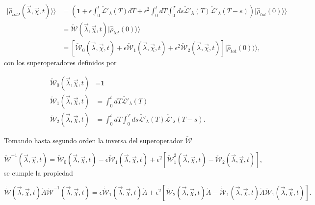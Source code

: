 \begin{appendixs}
\begin{align*}
    |\hat{\rho}_{totI}(\vec{\lambda},\vec{\chi},t)\rangle \rangle  & = \left( \textbf{1} + \epsilon \int_{0}^{t}\check{\mathcal{L}}'_{\lambda}(T)dT + \epsilon^{2}\int_{0}^{t}dT\int_{0}^{T}ds \check{\mathcal{L}}'_{\lambda}(T)\check{\mathcal{L}}'_{\lambda}(T-s) \right)|\hat{\rho}_{tot}(0)\rangle \rangle  \\
    & = \check{\mathcal{W}}(\vec{\lambda},\vec{\chi},t)|\hat{\rho}_{tot}(0)\rangle \rangle \\
    & =  [\check{\mathcal{W}}_{0}(\vec{\lambda},\vec{\chi},t) + \epsilon \check{\mathcal{W}}_{1}(\vec{\lambda},\vec{\chi},t) + \epsilon^{2}\check{\mathcal{W}}_{2}(\vec{\lambda},\vec{\chi},t)] |\hat{\rho}_{tot}(0)\rangle \rangle,
\end{align*}
con los superoperadores definidos por 

\begin{align*}
    \check{\mathcal{W}}_{0}(\vec{\lambda},\vec{\chi},t) &  = \textbf{1}\\
    \check{\mathcal{W}}_{1}(\vec{\lambda},\vec{\chi},t) & = \int_{0}^{t}dT \check{\mathcal{L}'}_{\lambda}(T) \\
    \check{\mathcal{W}}_{2}(\vec{\lambda},\vec{\chi},t) & = \int_{0}^{t}dT \int_{0}^{T}ds \check{\mathcal{L}'}_{\lambda}(T)\check{\mathcal{L}'}_{\lambda}(T-s).
\end{align*}

Tomando hasta segundo orden la inversa del superoperador $\check{\mathcal{W}}$

\begin{equation}
    \check{\mathcal{W}}^{-1}(\vec{\lambda},\vec{\chi},t) =  \check{\mathcal{W}}_{0}(\vec{\lambda},\vec{\chi},t) - \epsilon  \check{\mathcal{W}}_{1}(\vec{\lambda},\vec{\chi},t) +  \epsilon^{2}[\check{\mathcal{W}}^{2}_{1}(\vec{\lambda},\vec{\chi},t) -  \check{\mathcal{W}}_{2}(\vec{\lambda},\vec{\chi},t) ],
\label{apendix2inverseW}
\end{equation}
se cumple la propiedad

\begin{equation}
    \dot{\check{\mathcal{W}}}(\vec{\lambda},\vec{\chi},t)\check{A}\check{\mathcal{W}}^{-1}(\vec{\lambda},\vec{\chi},t) = \epsilon \dot{\check{\mathcal{W}}}_{1}(\vec{\lambda},\vec{\chi},t)\check{A} + \epsilon^{2}[\dot{\check{\mathcal{W}}}_{2}(\vec{\lambda},\vec{\chi},t)\check{A} - \dot{\check{\mathcal{W}}}_{1}(\vec{\lambda},\vec{\chi},t)\check{A}\check{\mathcal{W}}_{1}(\vec{\lambda},\vec{\chi},t) ].
    \label{apendix2Wproperty}
\end{equation}


\end{appendixs}
